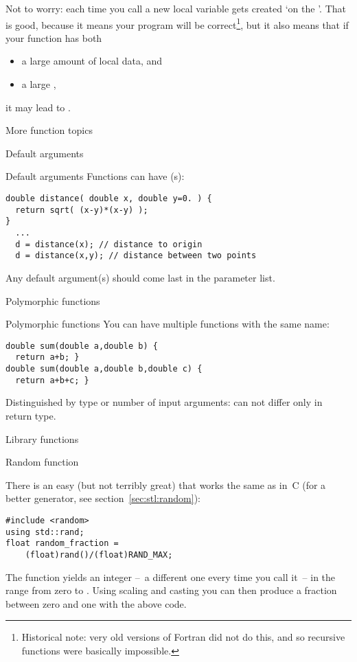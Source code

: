 Not to worry: each time you call  a new local variable
 gets created `on the '. That is good, because it means your program
will be correct\footnote{Historical note: very old versions of Fortran
  did not do this, and so recursive functions were basically
  impossible.}, but it also means that if your function has both
\begin{itemize}
\item a large amount of local data, and
\item a large ,
\end{itemize}
it may lead to .

 {More function topics}

 {Default arguments}

\begin{block}{Default arguments}
  \label{sl:def-arg}
  Functions can have (s):
\begin{lstlisting}
double distance( double x, double y=0. ) {
  return sqrt( (x-y)*(x-y) );
}
  ...
  d = distance(x); // distance to origin
  d = distance(x,y); // distance between two points
\end{lstlisting}
Any default argument(s) should come last in the parameter list.
\end{block}

 {Polymorphic functions}
\label{sec:polyfunc}

\begin{block}{Polymorphic functions}
  \label{sl:func-poly}
  You can have multiple functions with the same name:
\begin{lstlisting}
double sum(double a,double b) {
  return a+b; }
double sum(double a,double b,double c) {
  return a+b+c; }
\end{lstlisting}
Distinguished by type or number of input arguments: can not differ only in return type.
\end{block}

 {Library functions}

 {Random function}
\label{sec:crand}

There is an easy (but not terribly great)
that works the same as in~C (for a better
generator, see section~\ref{sec:stl:random}):
%
\begin{lstlisting}
#include <random>
using std::rand;
float random_fraction =
    (float)rand()/(float)RAND_MAX;
\end{lstlisting}
%
The function  yields an integer --~a different one
every time you call it~-- in the range from zero to
.
Using scaling and casting you can then produce a fraction between zero
and one with the above code.

